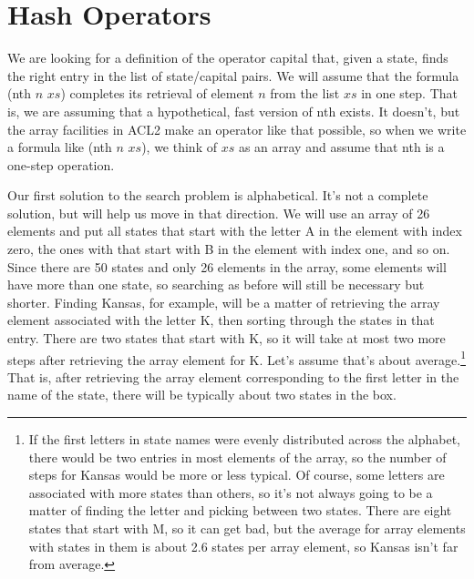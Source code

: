 \section{Hash Operators}

We are looking for a definition of the operator
\textsf{capital} that, given a state, finds the right entry
in the list of state/capital pairs.
We will assume that the formula \textsf{(nth} $n$ $xs$\textsf{)}
completes its retrieval of element $n$ from the list $xs$
in one step. That is, we are assuming that a hypothetical,
fast version of \textsf{nth} exists. It doesn't, but the
array facilities in ACL2 make an operator like that possible,
so when we write a formula like
\textsf{(nth} $n$ $xs$\textsf{)},
we think of $xs$ as an array and assume that
\textsf{nth} is a one-step operation.

Our first solution to the search problem is alphabetical.
It's not a complete solution, but will help us move in that direction.
We will use an array of 26 elements
and put all states that start with the letter A in
the element with index zero,
the ones with that start with B in the element with index one, and so on.
Since there are 50 states and only
26 elements in the array, some elements will have more than one state,
so searching as before will still be necessary but shorter.
Finding Kansas, for example, will be
a matter of retrieving the array element associated with
the letter K, then sorting through the states in that entry.
There are two states that start with K,
so it will take at most two more steps after retrieving
the array element for K.  Let's assume that's about
average.\footnote{If the first letters in state names
were evenly distributed across the alphabet, there would be
two entries in most elements of the array, so the number of steps
for Kansas would be more or less typical.
Of course, some letters are associated with more states than
others, so it's not always going to be a matter of finding
the letter and picking between two states. There are eight
states that start with M, so it can get bad,
but the average for array elements with states in them
is about 2.6 states per array element, so
Kansas isn't far from average.}
That is, after retrieving the array element corresponding to
the first letter in the name of the state, there will
be typically about two states in the box.


